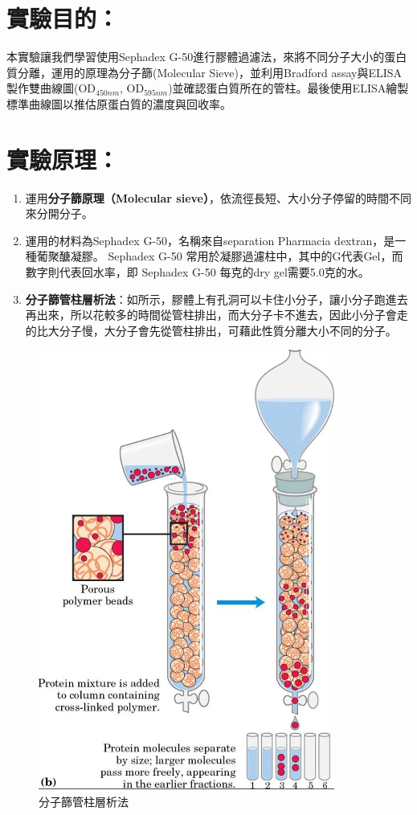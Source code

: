 \setlength{\parindent}{2em} %

\section*{實驗目的：}
本實驗讓我們學習使用Sephadex G-50進行膠體過濾法，來將不同分子大小的蛋白質分離，運用的原理為分子篩(Molecular Sieve)，並利用Bradford assay與ELISA製作雙曲線圖(OD$_{450nm}$, OD$_{595nm}$)並確認蛋白質所在的管柱。最後使用ELISA繪製標準曲線圖以推估原蛋白質的濃度與回收率。


\section*{實驗原理：}

\begin{enumerate}
  \item 運用\textbf{分子篩原理（Molecular sieve）}，依流徑長短、大小分子停留的時間不同來分開分子。
  \item 運用的材料為Sephadex G-50，名稱來自separation Pharmacia dextran，是一種葡聚醣凝膠。\cite{Wikipedia_2023_Sephadex} Sephadex G-50 常用於凝膠過濾柱中，其中的G代表Gel，而數字則代表回水率，即 Sephadex G-50 每克的dry gel需要5.0克的水。\cite{Sephadex65:online}%

  \item \textbf{分子篩管柱層析法}：如所示，膠體上有孔洞可以卡住小分子，讓小分子跑進去再出來，所以花較多的時間從管柱排出，而大分子卡不進去，因此小分子會走的比大分子慢，大分子會先從管柱排出，可藉此性質分離大小不同的分子。
\end{enumerate}

\begin{figure}[H]
\centering
\includegraphics[width=.5\textwidth]{paste_src/2023-10-22-15-08-32.png}
\caption{分子篩管柱層析法}
\label{fig:mf}
\end{figure}


